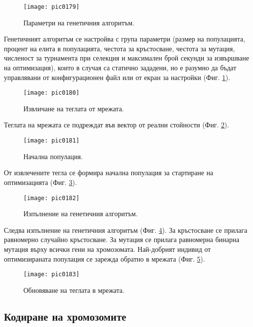 \begin{figure}[h]
  \centering
  \texttt{[image: pic0179]}
  \caption{Параметри на генетичния алгоритъм.}
\label{fig:pic0179}
\end{figure}
\FloatBarrier

Генетичният алгоритъм се настройва с група параметри (размер на популацията, процент на елита в популацията, честота за кръстосване, честота за мутация, численост за турнамента при селекция и максимален брой секунди за извършване на оптимизация), които в случая са статично зададени, но е разумно да бъдат управлявани от конфигурационен файл или от екран за настройки (Фиг. \ref{fig:pic0179}). 

\begin{figure}[h]
  \centering
  \texttt{[image: pic0180]}
  \caption{Извличане на теглата от мрежата.}
\label{fig:pic0180}
\end{figure}
\FloatBarrier

Теглата на мрежата се подреждат във вектор от реални стойности (Фиг. \ref{fig:pic0180}).

\begin{figure}[h]
  \centering
  \texttt{[image: pic0181]}
  \caption{Начална популация.}
\label{fig:pic0181}
\end{figure}
\FloatBarrier

От извлечените тегла се формира начална популация за стартиране на оптимизацията (Фиг. \ref{fig:pic0181}).

\begin{figure}[h]
  \centering
  \texttt{[image: pic0182]}
  \caption{Изпълнение на генетичния алгоритъм.}
\label{fig:pic0182}
\end{figure}
\FloatBarrier

Следва изпълнение на генетичния алгоритъм (Фиг. \ref{fig:pic0182}). За кръстосване се прилага равномерно случайно кръстосване. За мутация се прилага равномерна бинарна мутация върху всички гени на хромозомата. Най-добрият индивид от оптимизираната популация се зарежда обратно в мрежата (Фиг. \ref{fig:pic0183}). 

\begin{figure}[h]
  \centering
  \texttt{[image: pic0183]}
  \caption{Обновяване на теглата в мрежата.}
\label{fig:pic0183}
\end{figure}
\FloatBarrier

\subsection{Кодиране на хромозомите}

